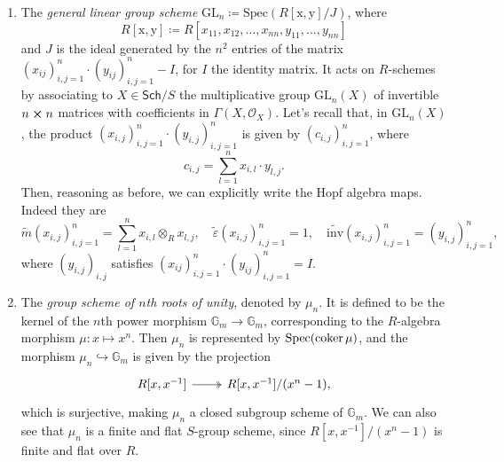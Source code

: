\begin{ex}
\begin{enumerate}
		\item The {\em general linear group scheme} $\mathrm{GL}_n \coloneqq 
			\mathrm{Spec}(R[\mathrm{x},\mathrm{y}]/J)$,
			where
			\begin{equation*}
				R[\mathrm{x},\mathrm{y}] \coloneqq
				R[x_{11}, x_{12}, \ldots, x_{nn},
				y_{11}, \ldots, y_{nn}]
			\end{equation*} 
			and $J$ is the ideal generated by the $n^2$ entries of the matrix
			$\left( x_{ij} \right)_{i,j=1}^n \cdot \left( y_{ij} \right)_{i,j=1}^n - I$,
			for $I$ the identity matrix.
			It acts on $R$-schemes by associating to
			$X \in \mathsf{Sch}/S$ the multiplicative group
			$\mathrm{GL}_n(X)$ of invertible $n \cross n$
			matrices with coefficients in $\Gamma \left( X , \mathcal{O}_{ X } \right)$.
			Let's recall that, in $\mathrm{GL}_n(X)$, the product
			$\left( x_{i,j} \right)_{i,j = 1}^n \cdot 
			\left( y_{i,j} \right)_{i,j = 1}^n$
			is given by $\left( c_{i,j} \right)_{i,j = 1}^n$, where
			\begin{equation*}
			c_{i,j} = \sum_{l=1}^{n} x_{i,l} \cdot y_{l,j}
			.\end{equation*} 
			Then, reasoning as before, we can explicitly write the Hopf algebra maps.
			Indeed they are
			\begin{equation*}
				\widetilde{m}(x_{i,j})_{i,j=1}^n = \sum_{l=1}^{n} x_{i,l} \otimes_R x_{l,j},
				\quad
				\widetilde{\varepsilon}(x_{i,j})_{i,j=1}^n = 1,
				\quad
				\widetilde{\mathrm{inv}}(x_{i,j})_{i,j=1}^n = (y_{i,j})_{i,j=1}^n
			,\end{equation*} 
			where $\left( y_{i,j} \right)_{i,j}$ satisfies 
			$\left( x_{ij} \right)_{i,j=1}^n \cdot \left( y_{ij} \right)_{i,j=1}^n = I$.


		\item The {\em group scheme of $n$th roots of unity}, denoted by $\mu_n$.
			It is defined to be the kernel of the $n$th power morphism
			$\mathbb{G}_m \to \mathbb{G}_m$,
			corresponding to the $R$-algebra morphism
			$\mu\colon x \mapsto x^n$.
			Then $\mu_n$ is represented by $\mathrm{Spec}(\operatorname{coker} \mu)$,
			and the morphism $\mu_n \hookrightarrow \mathbb{G}_m$ is given by the projection
			\begin{equation*}
			\begin{tikzcd}
				R[x,x^{-1}] \arrow[r, "", twoheadrightarrow] &
				R[x,x^{-1}] / (x^n - 1)
			,\end{tikzcd}
			\end{equation*}
			which is surjective, making $\mu_n$
			a closed subgroup scheme of $\mathbb{G}_m$.
			We can also see that 
			$\mu_n$ is a finite and flat $S$-group scheme, 
			since $R[x,x^{-1}] / (x^n-1)$ is finite and flat over $R$.



\end{enumerate}
\end{ex}
